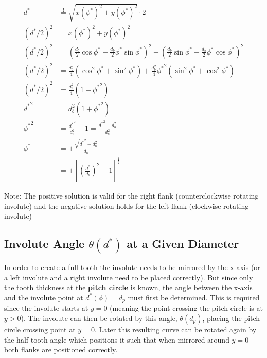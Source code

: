 \begin{subequations}
\begin{align}
    d^*         &\stackrel{!}{=} \sqrt{x(\phi^*)^2 + y(\phi^*)^2}\cdot2 \\
    (d^*/2)^2   &= x(\phi^*)^2 + y(\phi^*)^2 \\
    (d^*/2)^2   &=  \left(
                        \frac{d_b}{2}\cos\phi^*
                        + \frac{d_b}{2}\phi^* \sin\phi^*
                    \right)^2
                    + \left(
                        \frac{d_b}{2}\sin\phi^*
                        - \frac{d_b}{2}\phi^* \cos\phi^*
                    \right)^2 \\
    (d^*/2)^2   &=  \frac{d_b^2}{4}(\cos^2\phi^* + \sin^2\phi^*)
                  + \frac{d_b^2}{4}{\phi^*}^2 (\sin^2\phi^* + \cos^2\phi^*) \\
    (d^*/2)^2   &= \frac{d_b^2}{4}(1 + {\phi^*}^2) \\
    {d^*}^2     &= d_b^2(1 + {\phi^*}^2) \\
    {\phi^*}^2  &= \frac{{d^*}^2}{d_b^2} - 1 = \frac{{d^*}^2 - d_b^2}{d_b^2} \\
    \phi^*      &= \pm\frac{\sqrt{{d^*}^2 - d_b^2}}{d_b} \\
                &= \pm\left[\left(\frac{d^* }{d_b}\right)^2 - 1\right]^{\frac{1}{2}}
\end{align}
\end{subequations}

Note: The positive solution is valid for the right flank (counterclockwise rotating involute) and the negative solution holds for the left flank (clockwise rotating involute)

\subsection{Involute Angle \texorpdfstring{$\theta(d^*)$}{θ(d*)} at a Given Diameter}
\label{subsec:involute_angle}
In order to create a full tooth the involute needs to be mirrored by the x-axis (or a left involute and a right involute need to be placed correctly). But since only the tooth thickness at the \textbf{pitch circle} is known, the angle between the x-axis and the involute point at $d^*(\phi)=d_p$ must first be determined. This is required since the involute starts at $y=0$ (meaning the point crossing the pitch circle is at $y>0$). The involute can then be rotated by this angle, $\theta(d_p)$, placing the pitch circle crossing point at $y=0$. Later this resulting curve can be rotated again by the half tooth angle which positions it such that when mirrored around $y=0$ both flanks are positioned correctly.

